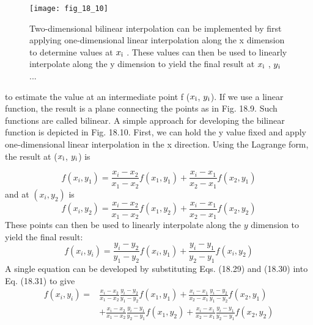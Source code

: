 \documentclass[../main.tex]{subfiles}
\begin{document}
\begin{figure}[H]
    \centering
    \texttt{[image: fig\_18\_10]}
   \caption{\textsf{Two-dimensional bilinear interpolation can be implemented by first applying one-dimensional
   linear interpolation along the x dimension to determine values at $x\textsubscript{i}$
   . These values can then be
   used to linearly interpolate along the y dimension to yield the final result at $x\textsubscript{i}$
   , $y\textsubscript{i}$
   ...}}\label{fig:fig_18_10}
\end{figure}

to estimate the value at an intermediate point f ($x\textsubscript{i}$, $y\textsubscript{i}$). If we use a linear function, the result is a plane connecting the points as in Fig. 18.9. Such functions are called bilinear.
A simple approach for developing the bilinear function is depicted in Fig. 18.10. First,
we can hold the y value fixed and apply one-dimensional linear interpolation in the x direction. Using the Lagrange form, the result at ($x\textsubscript{i}$, $y\textsubscript{i}$) is

\begin{equation}
    \tag{18.29}
f\left(x_{i}, y_{1}\right)=\frac{x_{i}-x_{2}}{x_{1}-x_{2}} f\left(x_{1}, y_{1}\right)+\frac{x_{i}-x_{1}}{x_{2}-x_{1}} f\left(x_{2}, y_{1}\right)
\end{equation}
and at $\left(x_{i}, y_{2}\right)$ is
\begin{equation}
    \tag{18.30}
f\left(x_{i}, y_{2}\right)=\frac{x_{i}-x_{2}}{x_{1}-x_{2}} f\left(x_{1}, y_{2}\right)+\frac{x_{i}-x_{1}}{x_{2}-x_{1}} f\left(x_{2}, y_{2}\right)
\end{equation}
These points can then be used to linearly interpolate along the $y$ dimension to yield the final result:
\begin{equation}
    \tag{18.31}
f\left(x_{i}, y_{i}\right)=\frac{y_{i}-y_{2}}{y_{1}-y_{2}} f\left(x_{i}, y_{1}\right)+\frac{y_{i}-y_{1}}{y_{2}-y_{1}} f\left(x_{i}, y_{2}\right)
\end{equation}
A single equation can be developed by substituting Eqs. (18.29) and (18.30) into Eq. (18.31) to give
\begin{equation}
    \tag{18.32}
\begin{aligned}
f\left(x_{i}, y_{i}\right)=& \frac{x_{i}-x_{2}}{x_{1}-x_{2}} \frac{y_{i}-y_{2}}{y_{1}-y_{2}} f\left(x_{1}, y_{1}\right)+\frac{x_{i}-x_{1}}{x_{2}-x_{1}} \frac{y_{i}-y_{2}}{y_{1}-y_{2}} f\left(x_{2}, y_{1}\right) \\
&+\frac{x_{i}-x_{2}}{x_{1}-x_{2}} \frac{y_{i}-y_{1}}{y_{2}-y_{1}} f\left(x_{1}, y_{2}\right)+\frac{x_{i}-x_{1}}{x_{2}-x_{1}} \frac{y_{i}-y_{1}}{y_{2}-y_{1}} f\left(x_{2}, y_{2}\right)
\end{aligned}
\end{equation}
\end{document}
